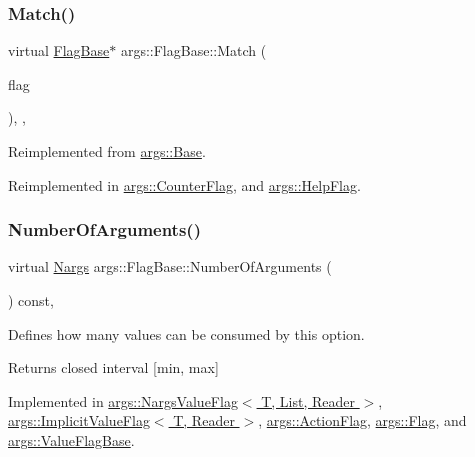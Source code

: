\subsubsection{\texorpdfstring{Match()}{Match()}}
{\footnotesize\ttfamily virtual \hyperlink{classargs_1_1_flag_base}{Flag\+Base}$\ast$ args\+::\+Flag\+Base\+::\+Match (\begin{DoxyParamCaption}\item[{const \hyperlink{structargs_1_1_either_flag}{Either\+Flag} \&}]{flag }\end{DoxyParamCaption})\hspace{0.3cm}{\ttfamily [inline]}, {\ttfamily [override]}, {\ttfamily [virtual]}}



Reimplemented from \hyperlink{classargs_1_1_base_a6d5a7be35d62f59fee5a52c06af3003e}{args\+::\+Base}.



Reimplemented in \hyperlink{classargs_1_1_counter_flag_ade999a8d89a8fd3db7508dfe7fdf851c}{args\+::\+Counter\+Flag}, and \hyperlink{classargs_1_1_help_flag_a1a555992a7c8350aca0ac1f292d91605}{args\+::\+Help\+Flag}.

\mbox{\label{classargs_1_1_flag_base_a6007ffeaa767893cb8eff5333d61673b}} 
\subsubsection{\texorpdfstring{Number\+Of\+Arguments()}{NumberOfArguments()}}
{\footnotesize\ttfamily virtual \hyperlink{structargs_1_1_nargs}{Nargs} args\+::\+Flag\+Base\+::\+Number\+Of\+Arguments (\begin{DoxyParamCaption}{ }\end{DoxyParamCaption}) const\hspace{0.3cm}{\ttfamily [pure virtual]}, {\ttfamily [noexcept]}}

Defines how many values can be consumed by this option.

\begin{DoxyReturn}{Returns}
closed interval \mbox{[}min, max\mbox{]} 
\end{DoxyReturn}


Implemented in \hyperlink{classargs_1_1_nargs_value_flag_a8db7ce6ec0d27f649dbfb1bba908078a}{args\+::\+Nargs\+Value\+Flag$<$ T, List, Reader $>$}, \hyperlink{classargs_1_1_implicit_value_flag_a7cfc67aca2b32921e722f51d349df2c5}{args\+::\+Implicit\+Value\+Flag$<$ T, Reader $>$}, \hyperlink{classargs_1_1_action_flag_aa341976acd895df15fb2bfe7182c48eb}{args\+::\+Action\+Flag}, \hyperlink{classargs_1_1_flag_a1bd707628d2987d3ccf2dbdb810302e4}{args\+::\+Flag}, and \hyperlink{classargs_1_1_value_flag_base_a96a10bfb949ad175dcf2ffba6a6ec3b6}{args\+::\+Value\+Flag\+Base}.

